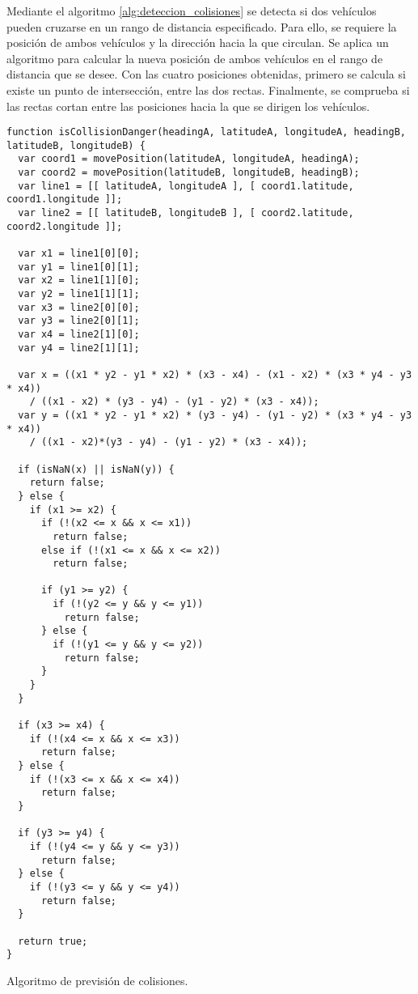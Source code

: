 Mediante el algoritmo \ref{alg:deteccion_colisiones} se detecta si dos vehículos pueden
cruzarse en un rango de distancia especificado. Para ello, se requiere la posición de
ambos vehículos y la dirección hacia la que circulan. Se aplica un algoritmo para calcular
la nueva posición de ambos vehículos en el rango de distancia que se desee. Con las cuatro
posiciones obtenidas, primero se calcula si existe un punto de intersección, entre las dos
rectas. Finalmente, se comprueba si las rectas cortan entre las posiciones hacia la que se
dirigen los vehículos.

\begin{listing}
	\begin{minipage}{.4\textwidth}
		\begin{verbatim}
function isCollisionDanger(headingA, latitudeA, longitudeA, headingB, latitudeB, longitudeB) {
  var coord1 = movePosition(latitudeA, longitudeA, headingA);
  var coord2 = movePosition(latitudeB, longitudeB, headingB);
  var line1 = [[ latitudeA, longitudeA ], [ coord1.latitude, coord1.longitude ]];
  var line2 = [[ latitudeB, longitudeB ], [ coord2.latitude, coord2.longitude ]];

  var x1 = line1[0][0];
  var y1 = line1[0][1];
  var x2 = line1[1][0];
  var y2 = line1[1][1];
  var x3 = line2[0][0];
  var y3 = line2[0][1];
  var x4 = line2[1][0];
  var y4 = line2[1][1];
	
  var x = ((x1 * y2 - y1 * x2) * (x3 - x4) - (x1 - x2) * (x3 * y4 - y3 * x4))
    / ((x1 - x2) * (y3 - y4) - (y1 - y2) * (x3 - x4));
  var y = ((x1 * y2 - y1 * x2) * (y3 - y4) - (y1 - y2) * (x3 * y4 - y3 * x4))
	/ ((x1 - x2)*(y3 - y4) - (y1 - y2) * (x3 - x4));
	
  if (isNaN(x) || isNaN(y)) {
    return false;
  } else {
    if (x1 >= x2) {
      if (!(x2 <= x && x <= x1))
        return false; 
      else if (!(x1 <= x && x <= x2))
        return false; 

      if (y1 >= y2) {
        if (!(y2 <= y && y <= y1))
          return false;
      } else {
        if (!(y1 <= y && y <= y2))
          return false;
      }
    }
  }

  if (x3 >= x4) {
	if (!(x4 <= x && x <= x3)) 
	  return false;
  } else {
    if (!(x3 <= x && x <= x4)) 
      return false;
  }

  if (y3 >= y4) {
    if (!(y4 <= y && y <= y3))
      return false;
  } else {
    if (!(y3 <= y && y <= y4)) 
      return false;
  }

  return true;	
}
	\end{verbatim}
\end{minipage}
\caption{Algoritmo de previsión de colisiones.}\label{alg:deteccion_colisiones}
\end{listing}
